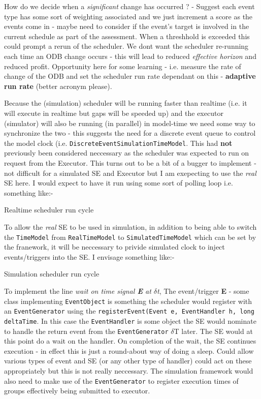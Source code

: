 \begin{enumerate}
How do we decide when a \emph{significant} change has occurred ? -  Suggest each event type has some sort of weighting associated and we just increment a score as the events come in - maybe need to consider if the event's target is involved in the current schedule as part of the assessment. When a threshhold is exceeded this could prompt a rerun of the scheduler. We dont want the scheduler re-running each time an ODB change occurs - this will lead to reduced \emph{effective horizon} and reduced profit. Opportunity here for some learning - i.e. measure the rate of change of the ODB and set the scheduler run rate dependant on this - {\bf adaptive run rate} (better acronym please).

Because the (simulation) scheduler will be running faster than realtime (i.e. it will execute in realtime but gaps will be speeded up) and the executor (simulator) will also be running (in parallel) in model-time we need some way to synchronize the two - this suggests the need for a discrete event queue to control the model clock (i.e. {\tt DiscreteEventSimulationTimeModel}. This had {\bf not} previously been considered neccessary as the scheduler was expected to run on request from the Executor. This turns out to be a bit of a bugger to implement - not difficult for a simulated SE and Executor but I am exepecting to use the \emph{real} SE here. I would expect to have it run using some sort of polling loop i.e. something like:-

\begin{algorithm}
\caption{Realtime scheduler run cycle}
\end{algorithm}

To allow the \emph{real} SE to be used in simulation, in addition to being able to switch the {\tt TimeModel} from {\tt RealTimeModel} to {\tt SimulatedTimeModel} which can be set by the franework, it will be neccessary to privide simulated clock to inject events/triggers into the SE. I envisage something like:-

\begin{algorithm}
\caption{Simulation scheduler run cycle}
\end{algorithm}

To implement the line \emph{wait on time signal {\bf E} at $\delta$t},  The event/trigger {\bf E} - some class implementing {\tt EventObject} is something the scheduler would register with an {\tt EventGenerator} using the {\tt registerEvent(Event e, EventHandler h, long deltaTime}. In this case the {\tt EventHandler} is some object the SE would nominate to handle the return event from the {\tt EventGenerator} $\delta$T later. The SE would at this point do a wait on the handler. On completion of the wait, the SE continues execution - in effect this is just a round-about way of doing a sleep. Could allow various types of event and SE (or any other type of handler) could act on these appropriately but this is not really neccessary. The simulation framework would also need to make use of the {\tt EventGenerator} to register execution times of groups effectively being submitted to executor. 



\end{enumerate}
